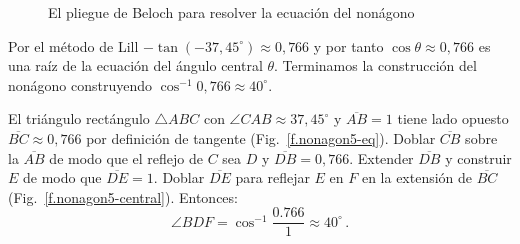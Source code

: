 \begin{figure}[ht]
\begin{center}
\end{center}
\caption{El pliegue de Beloch para resolver la ecuación del nonágono}\label{f.nonagon3}
\end{figure}

Por el método de Lill $-\tan (-37,45^\circ)\approx 0,766$ y por tanto $\cos \theta \approx 0,766$ es una raíz de la ecuación del ángulo central $\theta$. Terminamos la construcción del nonágono construyendo $\cos^{-1} 0,766\approx 40^\circ$.

El triángulo rectángulo $\triangle ABC$ con $\angle CAB\approx 37,45^\circ$ y $\overline{AB}=1$ tiene lado opuesto $\overline{BC}\approx 0,766$ por definición de tangente (Fig.~\ref{f.nonagon5-eq}).
Doblar $\overline{CB}$ sobre la $\overline{AB}$ de modo que el reflejo de $C$ sea $D$ y $\overline{DB}=0,766$. Extender $\overline{DB}$ y construir $E$ de modo que $\overline{DE}=1$.
Doblar $\overline{DE}$ para reflejar $E$ en $F$ en la extensión de $\overline{BC}$ (Fig.~\ref{f.nonagon5-central}). Entonces:
\[
\angle BDF=\cos^{-1} \frac{0.766}{1}\approx 40^\circ\,.
\]

